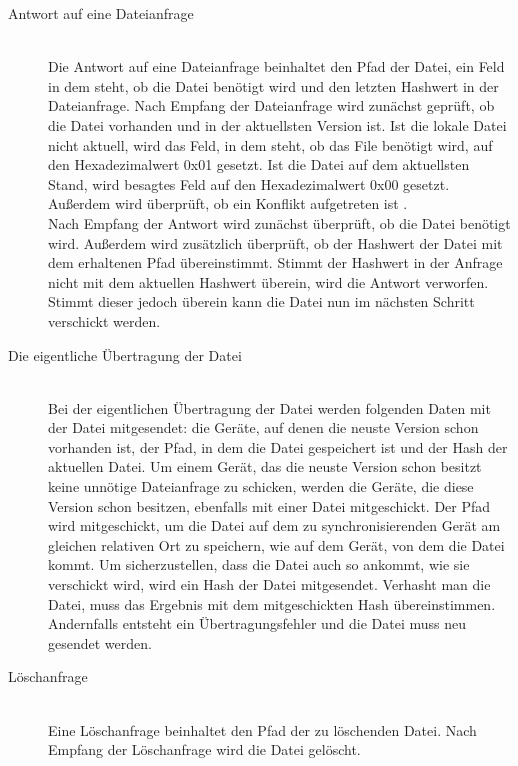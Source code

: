 \begin{description}
	\item [{Antwort auf eine Dateianfrage}] \hfill \\
		Die Antwort auf eine Dateianfrage beinhaltet den Pfad der Datei, ein Feld in dem steht, ob die Datei benötigt wird und den letzten Hashwert in der Dateianfrage. Nach Empfang der Dateianfrage wird zunächst geprüft, ob die Datei vorhanden und in der aktuellsten Version ist.  Ist die lokale Datei nicht aktuell, wird das Feld, in dem steht, ob das File benötigt wird, auf den Hexadezimalwert 0x01 gesetzt. Ist die Datei auf dem aktuellsten Stand, wird besagtes Feld auf den Hexadezimalwert 0x00 gesetzt. Außerdem wird überprüft, ob ein Konflikt aufgetreten ist .\\
		Nach Empfang der Antwort wird zunächst überprüft, ob die Datei benötigt wird. Außerdem wird zusätzlich überprüft, ob der Hashwert der Datei mit dem erhaltenen Pfad übereinstimmt. Stimmt der Hashwert in der Anfrage nicht mit dem aktuellen Hashwert überein, wird die Antwort verworfen. Stimmt dieser jedoch überein kann die Datei nun im nächsten Schritt verschickt werden.
		
	\item [{Die eigentliche Übertragung der Datei}] \hfill \\
		Bei der eigentlichen Übertragung der Datei werden folgenden Daten mit der Datei mitgesendet: die Geräte, auf denen die neuste Version schon vorhanden ist, der Pfad, in dem die Datei gespeichert ist und der Hash der aktuellen Datei. Um einem Gerät, das die neuste Version schon besitzt keine unnötige Dateianfrage zu schicken, werden die Geräte, die diese Version schon besitzen, ebenfalls mit einer Datei mitgeschickt. Der Pfad wird mitgeschickt, um die Datei auf dem zu synchronisierenden Gerät am gleichen relativen Ort zu speichern, wie auf dem Gerät, von dem die Datei kommt. Um sicherzustellen, dass die Datei auch so ankommt, wie sie verschickt wird, wird ein Hash der Datei mitgesendet. Verhasht man die Datei, muss das Ergebnis mit dem mitgeschickten Hash übereinstimmen. Andernfalls entsteht ein Übertragungsfehler und die Datei muss neu gesendet werden.
		
	\item [{Löschanfrage}] \hfill \\
		Eine Löschanfrage beinhaltet den Pfad der zu löschenden Datei. Nach Empfang der Löschanfrage wird die Datei gelöscht.
		
\end{description}

